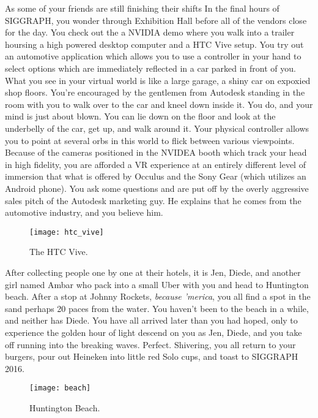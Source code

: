 \documentclass[../main.tex]{subfiles}
\begin{document}
As some of your friends are still finishing their shifts In the final hours of SIGGRAPH, you wonder through Exhibition Hall before all of the vendors close for the day. You check out the a NVIDIA demo where you walk into a trailer hoursing a high powered desktop computer and a HTC Vive setup. You try out an automotive application which allows you to use a controller in your hand to select options which are immediately reflected in a car parked in front of you. What you see in your virtual world is like a large garage, a shiny car on expoxied shop floors. You're encouraged by the gentlemen from Autodesk standing in the room with you to walk over to the car and kneel down inside it. You do, and your mind is just about blown. You can lie down on the floor and look at the underbelly of the car, get up, and walk around it. Your physical controller allows you to point at several orbs in this world to flick between various viewpoints. Because of the cameras positioned in the NVIDEA booth which track your head in high fidelity, you are afforded a VR experience at an entirely different level of immersion that what is offered by Occulus and the Sony Gear (which utilizes an Android phone). You ask some questions and are put off by the overly aggressive sales pitch of the Autodesk marketing guy. He explains that he comes from the automotive industry, and you believe him.

\begin{figure}[h!]
	\centering
	\texttt{[image: htc\_vive]}
	\caption*{The HTC Vive.}
\end{figure}


After collecting people one by one at their hotels, it is Jen, Diede, and another girl named Ambar who pack into a small Uber with you and head to Huntington beach. After a stop at Johnny Rockets, \textit{because 'merica}, you all find a spot in the sand perhaps 20 paces from the water. You haven't been to the beach in a while, and neither has Diede. You have all arrived later than you had hoped, only to experience the golden hour of light descend on you as Jen, Diede, and you take off running into the breaking waves. Perfect. Shivering, you all return to your burgers, pour out Heineken into little red Solo cups, and toast to SIGGRAPH 2016.

\begin{figure}[h!]
	\centering
	\texttt{[image: beach]}
	\caption*{Huntington Beach.}
\end{figure}
\end{document}
